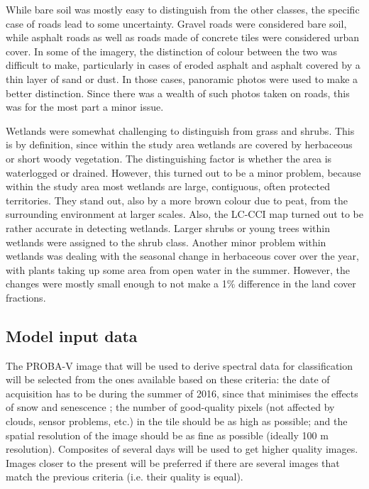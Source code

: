 \documentclass[a4paper,10pt]{book}
\begin{document}
While bare soil was mostly easy to distinguish from the other classes, the specific case of roads lead to some uncertainty. Gravel roads were considered bare soil, while asphalt roads as well as roads made of concrete tiles were considered urban cover. In some of the imagery, the distinction of colour between the two was difficult to make, particularly in cases of eroded asphalt and asphalt covered by a thin layer of sand or dust. In those cases, panoramic photos were used to make a better distinction. Since there was a wealth of such photos taken on roads, this was for the most part a minor issue.

Wetlands were somewhat challenging to distinguish from grass and shrubs. This is by definition, since within the study area wetlands are covered by herbaceous or short woody vegetation. The distinguishing factor is whether the area is waterlogged or drained. However, this turned out to be a minor problem, because within the study area most wetlands are large, contiguous, often protected territories. They stand out, also by a more brown colour due to peat, from the surrounding environment at larger scales. Also, the LC-CCI map turned out to be rather accurate in detecting wetlands. Larger shrubs or young trees within wetlands were assigned to the shrub class. Another minor problem within wetlands was dealing with the seasonal change in herbaceous cover over the year, with plants taking up some area from open water in the summer. However, the changes were mostly small enough to not make a 1\% difference in the land cover fractions.

\subsection{Model input data}

The PROBA-V image that will be used to derive spectral data for classification will be selected from the ones available based on these criteria: the date of acquisition has to be during the summer of 2016, since that minimises the effects of snow and senescence \citep{bartalev2014probavboreal}; the number of good-quality pixels (not affected by clouds, sensor problems, etc.) in the tile should be as high as possible; and the spatial resolution of the image should be as fine as possible (ideally 100 m resolution). Composites of several days will be used to get higher quality images. Images closer to the present will be preferred if there are several images that match the previous criteria (i.e. their quality is equal).
\end{document}
